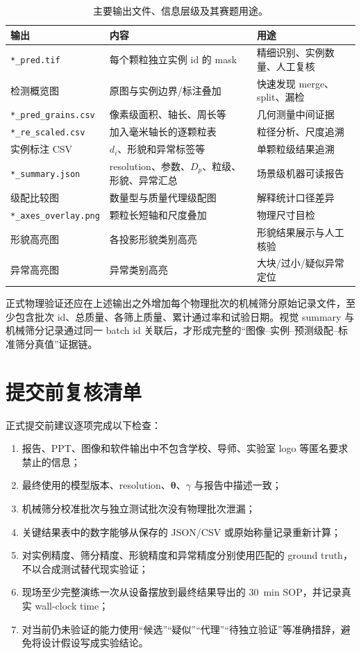 \begin{table}[htbp]
\centering
\caption{主要输出文件、信息层级及其赛题用途。}
\label{tab:appendix-outputs}
\small
\renewcommand{\arraystretch}{1.15}
\begin{tabular}{>{\raggedright\arraybackslash}p{4.5cm}>{\raggedright\arraybackslash}p{4.2cm}>{\raggedright\arraybackslash}p{4.0cm}}
\toprule
输出 & 内容 & 用途 \\
\midrule
\texttt{*\_pred.tif} & 每个颗粒独立实例 id 的 mask & 精细识别、实例数量、人工复核 \\
检测概览图 & 原图与实例边界/标注叠加 & 快速发现 merge、split、漏检 \\
\texttt{*\_pred\_grains.csv} & 像素级面积、轴长、周长等 & 几何测量中间证据 \\
\texttt{*\_re\_scaled.csv} & 加入毫米轴长的逐颗粒表 & 粒径分析、尺度追溯 \\
实例标注 CSV & $d_i$、形貌和异常标签等 & 单颗粒级结果追溯 \\
\texttt{*\_summary.json} & resolution、参数、$D_p$、粒级、形貌、异常汇总 & 场景级机器可读报告 \\
级配比较图 & 数量型与质量代理级配图 & 解释统计口径差异 \\
\texttt{*\_axes\_overlay.png} & 颗粒长短轴和尺度叠加 & 物理尺寸目检 \\
形貌高亮图 & 各投影形貌类别高亮 & 形貌结果展示与人工核验 \\
异常高亮图 & 异常类别高亮 & 大块/过小/疑似异常定位 \\
\bottomrule
\end{tabular}
\end{table}

正式物理验证还应在上述输出之外增加每个物理批次的机械筛分原始记录文件，至少包含批次 id、总质量、各筛上质量、累计通过率和试验日期。视觉 summary 与机械筛分记录通过同一 batch id 关联后，才形成完整的“图像--实例--预测级配--标准筛分真值”证据链。

\section{提交前复核清单}
\label{app:submission-checklist}

正式提交前建议逐项完成以下检查：
\begin{enumerate}[leftmargin=2em]
  \item 报告、PPT、图像和软件输出中不包含学校、导师、实验室 logo 等匿名要求禁止的信息；
  \item 最终使用的模型版本、resolution、$\boldsymbol{\theta}$、$\gamma$ 与报告中描述一致；
  \item 机械筛分校准批次与独立测试批次没有物理批次泄漏；
  \item 关键结果表中的数字能够从保存的 JSON/CSV 或原始称量记录重新计算；
  \item 对实例精度、筛分精度、形貌精度和异常精度分别使用匹配的 ground truth，不以合成测试替代现实验证；
  \item 现场至少完整演练一次从设备摆放到最终结果导出的 30~min SOP，并记录真实 wall-clock time；
  \item 对当前仍未验证的能力使用“候选”“疑似”“代理”“待独立验证”等准确措辞，避免将设计假设写成实验结论。
\end{enumerate}
